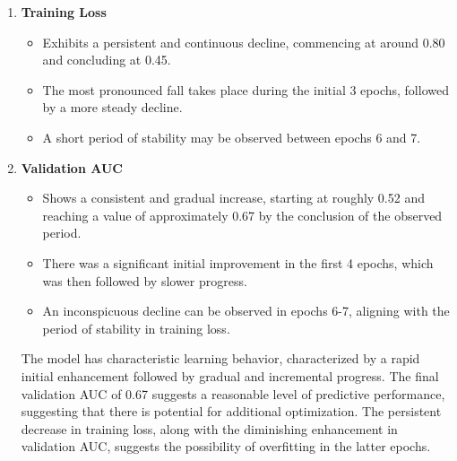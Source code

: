 \documentclass[9pt,twocolumn,twoside,lineno]{gsajnl}
\begin{document}
\begin{enumerate}
    \item \textbf{Training Loss}
    \begin{itemize}
        \item Exhibits a persistent and continuous decline, commencing at around 0.80 and concluding at 0.45.
        \item The most pronounced fall takes place during the initial 3 epochs, followed by a more steady decline.
        \item A short period of stability may be observed between epochs 6 and 7.
    \end{itemize}
    \item \textbf{Validation AUC}
    \begin{itemize}
        \item Shows a consistent and gradual increase, starting at roughly 0.52 and reaching a value of approximately 0.67 by the conclusion of the observed period.
    
        \item There was a significant initial improvement in the first 4 epochs, which was then followed by slower progress.
        \item An inconspicuous decline can be observed in epochs 6-7, aligning with the period of stability in training loss.
    \end{itemize}
    The model has characteristic learning behavior, characterized by a rapid initial enhancement followed by gradual and incremental progress. The final validation AUC of 0.67 suggests a reasonable level of predictive performance, suggesting that there is potential for additional optimization. The persistent decrease in training loss, along with the diminishing enhancement in validation AUC, suggests the possibility of overfitting in the latter epochs.
\end{enumerate}
\end{document}
